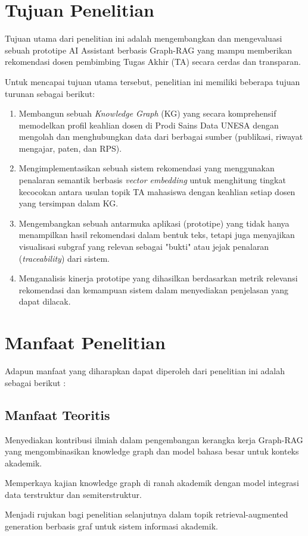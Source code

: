 \section{Tujuan Penelitian}
Tujuan utama dari penelitian ini adalah mengembangkan dan mengevaluasi sebuah prototipe AI Assistant berbasis Graph-RAG yang mampu memberikan rekomendasi dosen pembimbing Tugas Akhir (TA) secara cerdas dan transparan. 

Untuk mencapai tujuan utama tersebut, penelitian ini memiliki beberapa tujuan turunan sebagai berikut:
\begin{enumerate}
	\item Membangun sebuah \textit{Knowledge Graph} (KG) yang secara komprehensif memodelkan profil keahlian dosen di Prodi Sains Data UNESA dengan mengolah dan menghubungkan data dari berbagai sumber (publikasi, riwayat mengajar, paten, dan RPS).
	\item Mengimplementasikan sebuah sistem rekomendasi yang menggunakan penalaran semantik berbasis \textit{vector embedding} untuk menghitung tingkat kecocokan antara usulan topik TA mahasiswa dengan keahlian setiap dosen yang tersimpan dalam KG.
	\item Mengembangkan sebuah antarmuka aplikasi (prototipe) yang tidak hanya menampilkan hasil rekomendasi dalam bentuk teks, tetapi juga menyajikan visualisasi subgraf yang relevan sebagai "bukti" atau jejak penalaran (\textit{traceability}) dari sistem.
	\item Menganalisis kinerja prototipe yang dihasilkan berdasarkan metrik relevansi rekomendasi dan kemampuan sistem dalam menyediakan penjelasan yang dapat dilacak.
\end{enumerate}

\section{Manfaat Penelitian}

Adapun manfaat yang diharapkan dapat diperoleh dari penelitian ini adalah sebagai berikut :

\subsection{Manfaat Teoritis}
\begin{subsectlist}
	\begin{packed_item_sub}
		\item Menyediakan kontribusi ilmiah dalam pengembangan kerangka kerja Graph-RAG yang mengombinasikan knowledge graph dan model bahasa besar untuk konteks akademik.
		\item Memperkaya kajian knowledge graph di ranah akademik dengan model integrasi data terstruktur dan semiterstruktur.
		\item Menjadi rujukan bagi penelitian selanjutnya dalam topik retrieval-augmented generation berbasis graf untuk sistem informasi akademik.
	\end{packed_item_sub}
\end{subsectlist}


